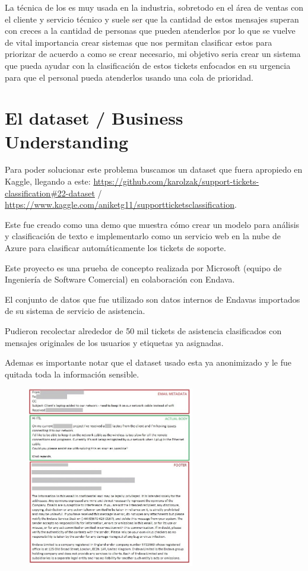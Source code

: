 \documentclass[12pt, fleqn]{report}                             %
\newcommand \Quote              {\qq}                           %
\theoremstyle{break}                                            %
\begin{document}
        La técnica de los \Quote{support ticket} es muy usada en la industria, sobretodo en el área de ventas con el cliente
        y servicio técnico y suele ser que la cantidad de estos mensajes superan con creces a la cantidad de personas que pueden
        atenderlos por lo que se vuelve de vital importancia crear sistemas que nos permitan clasificar estos para priorizar
        de acuerdo a como se crear necesario, mi objetivo seria crear un sistema que pueda ayudar con la clasificación de
        estos tickets enfocados en su urgencia para que el personal pueda atenderlos usando una cola de prioridad.

    \chapter{El dataset / Business Understanding}

        Para poder solucionar este problema buscamos un dataset que fuera apropiedo en Kaggle, llegando a este:
        \url{https://github.com/karolzak/support-tickets-classification#22-dataset} / \url{https://www.kaggle.com/aniketg11/supportticketsclassification}.

        Este fue creado como una demo que muestra cómo crear un modelo para análisis y clasificación de texto e 
        implementarlo como un servicio web en la nube de Azure para clasificar automáticamente los tickets de soporte. 

        Este proyecto es una prueba de concepto realizada por Microsoft (equipo de Ingeniería de Software Comercial) en 
        colaboración con Endava.

        El conjunto de datos que fue utilizado son datos internos de Endavas importados de su sistema 
        de servicio de asistencia. 
        
        Pudieron recolectar alrededor de 50 mil tickets de asistencia clasificados
        con mensajes originales de los usuarios y etiquetas ya asignadas.

        Ademas es importante notar que el dataset usado esta ya anonimizado y le fue quitada toda la información sensible.
        \begin{figure}[h!]
            \centering
            \includegraphics[width=0.65\textwidth]{x}
        \end{figure}
\end{document}
